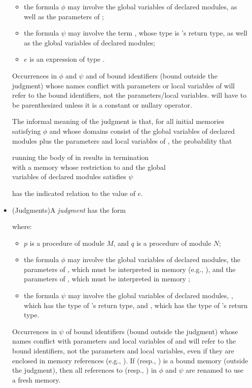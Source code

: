 \begin{itemize}
\begin{itemize}
\item the formula $\phi$ may involve the global variables of declared
  modules, as well as the parameters of ;

\item the formula $\psi$ may involve the term , whose type is
  's return type, as well as the global variables of
  declared modules;

\item $e$ is an expression of type .
\end{itemize}
Occurrences in $\phi$ and $\psi$ and of bound identifiers (bound
outside the judgment) whose names conflict with parameters or local
variables of  will refer to the bound identifiers, not the
parameters/local variables.  will have to be parenthesized
unless it is a constant or nullary operator.

The informal meaning of the \phl judgment is that, for all initial
memories  satisfying $\phi$ and whose domains consist of the
global variables of declared modules plus the parameters and local
variables of , the probability that
\begin{center}
  running the body of  in  results in
  termination \\ with a memory whose restriction to  and
  the global \\ variables of declared modules satisfies $\psi$
\end{center}
has the indicated relation to the value of $e$.

\item (\prhl Judgments)\quad A \prhl \emph{judgment} has the form
  \begin{center}
  \end{center}
where:
\begin{itemize}
\item $p$ is a procedure of module $M$, and $q$ is a procedure of module
 $N$;

\item the formula $\phi$ may involve the global variables of declared
  modules, the parameters of , which must be interpreted
  in memory  (e.g., ), and the parameters of
  , which must be interpreted in memory ;

\item the formula $\psi$ may involve the global variables of declared
  modules, , which has the type of 's return type,
  and , which has the type of 's return type.
\end{itemize}
Occurrences in $\psi$ of bound identifiers (bound outside the
judgment) whose names conflict with parameters and local variables of
 and  will refer to the bound identifiers, not
the parameters and local variables, even if they are enclosed in
memory references (e.g., ). If  (resp., ) is
a bound memory (outside the judgment), then all references to 
(resp., ) in $\phi$ and $\psi$ are renamed to use a fresh
memory.


\end{itemize}
